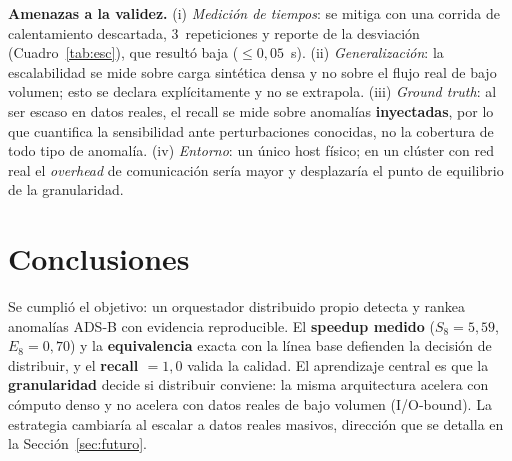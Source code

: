 \documentclass[letterpaper,11pt]{article}
\begin{document}
\textbf{Amenazas a la validez.} (i) \emph{Medición de tiempos}: se mitiga con una corrida de calentamiento
descartada, 3~repeticiones y reporte de la desviación (Cuadro~\ref{tab:esc}), que resultó baja
($\le 0{,}05$~s). (ii) \emph{Generalización}: la escalabilidad se mide sobre carga sintética densa y no
sobre el flujo real de bajo volumen; esto se declara explícitamente y no se extrapola. (iii) \emph{Ground
truth}: al ser escaso en datos reales, el recall se mide sobre anomalías \textbf{inyectadas}, por lo que
cuantifica la sensibilidad ante perturbaciones conocidas, no la cobertura de todo tipo de anomalía. (iv)
\emph{Entorno}: un único host físico; en un clúster con red real el \emph{overhead} de comunicación sería
mayor y desplazaría el punto de equilibrio de la granularidad.

\section{Conclusiones}
Se cumplió el objetivo: un orquestador distribuido propio detecta y rankea anomalías ADS-B con evidencia
reproducible. El \textbf{speedup medido} ($S_8=5{,}59$, $E_8=0{,}70$) y la \textbf{equivalencia} exacta
con la línea base defienden la decisión de distribuir, y el \textbf{recall $=1{,}0$} valida la calidad. El
aprendizaje central es que la \textbf{granularidad} decide si distribuir conviene: la misma arquitectura
acelera con cómputo denso y no acelera con datos reales de bajo volumen (I/O-bound). La estrategia
cambiaría al escalar a datos reales masivos, dirección que se detalla en la Sección~\ref{sec:futuro}.

\end{document}
